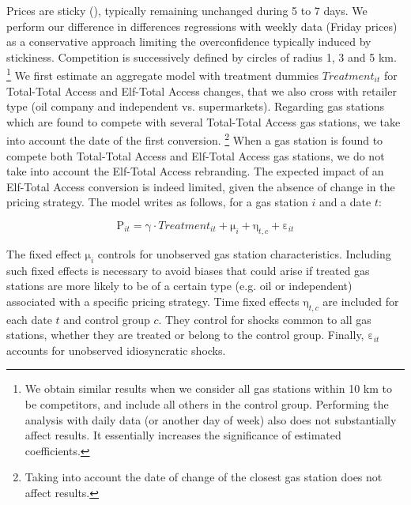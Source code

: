 \documentclass[english]{article}
\begin{document}
Prices are sticky (\cite{GAU15}), typically remaining unchanged during 5 to 7 days. We perform our difference in differences regressions with weekly data (Friday prices) as a conservative approach
limiting the overconfidence typically induced by stickiness. Competition is successively defined by circles of radius 1, 3 and 5 km.%
\footnote{We obtain similar results when we consider all gas stations within 10 km to be competitors, and include all others in the control group. Performing the analysis with daily data (or another day of week)
also does not substantially affect results. It essentially increases the significance of estimated coefficients.%
} We first estimate an aggregate model with treatment dummies $Treatment_{it}$ for Total-Total Access and Elf-Total Access changes, that we also cross with retailer type (oil company and independent vs. supermarkets). Regarding gas stations which are found to compete with several Total-Total Access gas stations, we take into account the date of the first conversion.%
\footnote{Taking into account the date of change of the closest gas station does not affect results.%
} When a gas station is found to compete both Total-Total Access and Elf-Total Access gas stations, we do not take into account the Elf-Total Access rebranding. The expected impact of an Elf-Total Access conversion is indeed limited, given the absence of change in the pricing strategy. The model writes as follows, for a gas station $i$ and a date $t$:

\begin{equation}
\mathrm{P}_{it}=\mathrm{\gamma}\cdot Treatment_{it}+\mathrm{\mu}_{i}+\mathrm{\eta}_{t,c}+\mathrm{\varepsilon}_{it}\label{eq:1}
\end{equation}

The fixed effect $\mathrm{\mu}_{i}$ controls for unobserved gas station characteristics. Including such fixed effects is necessary to avoid biases that could arise if treated gas stations are more likely to be of a certain type (e.g. oil or independent) associated with a specific pricing strategy. Time fixed effects $\mathrm{\eta}_{t,c}$ are included for each date $t$ and control group $c$. They control for shocks common to all gas stations, whether they are treated or belong to the control group. Finally, $\mathrm{\varepsilon}_{it}$ accounts for unobserved idiosyncratic shocks.
\medskip{}
\end{document}
